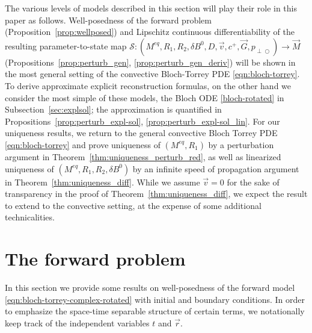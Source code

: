 \documentclass{ws-m3as}
\def\pp{p_{\perp\!\!\!\!\!\bigcirc}}
\newcommand{\revision}[1]{{ #1}}
\newcommand{\Margin}[1]{}
\begin{document}
\Margin{R2 (1)}
\revision{
The various levels of models described in this section will play their role in this paper as follows. Well-posedness of the forward problem (Proposition~\ref{prop:wellposed}) and Lipschitz continuous differentiability of the resulting parameter-to-state map $\mathcal{S}:(M^{eq},R_1,R_2,\delta B^0,D,\vec v,c^+,\vec G,\pp)\to \vec{M}$ (Propositions~\ref{prop:perturb_gen}, \ref{prop:perturb_gen_deriv}) will be shown in the most general setting of the convective Bloch-Torrey PDE \eqref{eqn:bloch-torrey}.
To derive approximate explicit reconstruction formulas, on the other hand we consider the most simple of these models, the Bloch ODE \eqref{bloch-rotated} in Subsection~\ref{sec:explsol}; the approximation is quantified in Propositions~\ref{prop:perturb_expl-sol}, \ref{prop:perturb_expl-sol_lin}.
For our uniqueness results, we return to the general convective Bloch Torrey PDE \eqref{eqn:bloch-torrey} and prove uniqueness of $(M^{eq},R_1)$ by a perturbation argument in Theorem~\ref{thm:uniqueness_perturb_red}, as well as linearized uniqueness of $(M^{eq},R_1,R_2,\delta B^0)$ by an infinite speed of propagation argument in Theorem~\ref{thm:uniqueness_diff}. While we assume $\vec v=0$ for the sake of transparency  in the proof of Theorem~\ref{thm:uniqueness_diff}, we expect the result to extend to the convective setting, at the expense of some additional technicalities.}


\section{The forward problem}\label{sec:forward}

In this section we provide some results on well-posedness of the forward model \eqref{eqn:bloch-torrey-complex-rotated} with initial and boundary conditions. In order to emphasize the space-time separable structure of certain terms, we notationally keep track of the independent variables $t$ and $\vec r$.
\end{document}
